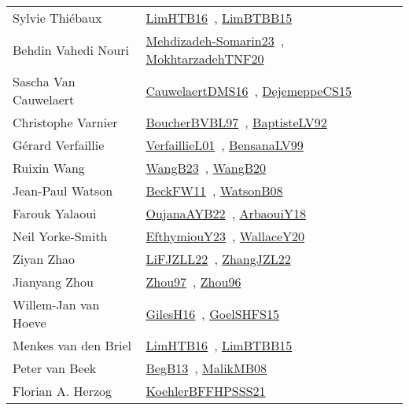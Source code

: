 {\begin{longtable}{p{4cm}p{20cm}}
Sylvie Thi{\'{e}}baux & \href{papers/LimHTB16.pdf}{LimHTB16}~\cite{LimHTB16}, \href{papers/LimBTBB15.pdf}{LimBTBB15}~\cite{LimBTBB15}\\
Behdin Vahedi Nouri & \href{papers/Mehdizadeh-Somarin23.pdf}{Mehdizadeh-Somarin23}~\cite{Mehdizadeh-Somarin23}, \href{}{MokhtarzadehTNF20}~\cite{MokhtarzadehTNF20}\\
Sascha Van Cauwelaert & \href{papers/CauwelaertDMS16.pdf}{CauwelaertDMS16}~\cite{CauwelaertDMS16}, \href{papers/DejemeppeCS15.pdf}{DejemeppeCS15}~\cite{DejemeppeCS15}\\
Christophe Varnier & \href{}{BoucherBVBL97}~\cite{BoucherBVBL97}, \href{papers/BaptisteLV92.pdf}{BaptisteLV92}~\cite{BaptisteLV92}\\
G{\'{e}}rard Verfaillie & \href{papers/VerfaillieL01.pdf}{VerfaillieL01}~\cite{VerfaillieL01}, \href{articles/BensanaLV99.pdf}{BensanaLV99}~\cite{BensanaLV99}\\
Ruixin Wang & \href{papers/WangB23.pdf}{WangB23}~\cite{WangB23}, \href{papers/WangB20.pdf}{WangB20}~\cite{WangB20}\\
Jean{-}Paul Watson & \href{}{BeckFW11}~\cite{BeckFW11}, \href{papers/WatsonB08.pdf}{WatsonB08}~\cite{WatsonB08}\\
Farouk Yalaoui & \href{papers/OujanaAYB22.pdf}{OujanaAYB22}~\cite{OujanaAYB22}, \href{papers/ArbaouiY18.pdf}{ArbaouiY18}~\cite{ArbaouiY18}\\
Neil Yorke{-}Smith & \href{papers/EfthymiouY23.pdf}{EfthymiouY23}~\cite{EfthymiouY23}, \href{articles/WallaceY20.pdf}{WallaceY20}~\cite{WallaceY20}\\
Ziyan Zhao & \href{papers/LiFJZLL22.pdf}{LiFJZLL22}~\cite{LiFJZLL22}, \href{papers/ZhangJZL22.pdf}{ZhangJZL22}~\cite{ZhangJZL22}\\
Jianyang Zhou & \href{articles/Zhou97.pdf}{Zhou97}~\cite{Zhou97}, \href{papers/Zhou96.pdf}{Zhou96}~\cite{Zhou96}\\
Willem{-}Jan van Hoeve & \href{papers/GilesH16.pdf}{GilesH16}~\cite{GilesH16}, \href{articles/GoelSHFS15.pdf}{GoelSHFS15}~\cite{GoelSHFS15}\\
Menkes van den Briel & \href{papers/LimHTB16.pdf}{LimHTB16}~\cite{LimHTB16}, \href{papers/LimBTBB15.pdf}{LimBTBB15}~\cite{LimBTBB15}\\
Peter van Beek & \href{}{BegB13}~\cite{BegB13}, \href{}{MalikMB08}~\cite{MalikMB08}\\
Florian A. Herzog & \href{articles/KoehlerBFFHPSSS21.pdf}{KoehlerBFFHPSSS21}~\cite{KoehlerBFFHPSSS21}\\

\end{longtable}}
